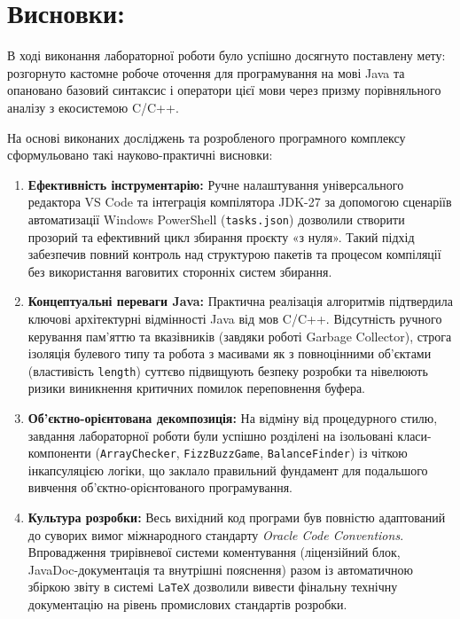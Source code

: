 \section{Висновки:}

В ході виконання лабораторної роботи було успішно досягнуто поставлену мету: 
розгорнуто кастомне робоче оточення для програмування на мові Java та опановано 
базовий синтаксис і оператори цієї мови через призму порівняльного аналізу з екосистемою C/C++.

На основі виконаних досліджень та розробленого програмного комплексу сформульовано такі науково-практичні висновки:
\begin{enumerate}
    \item \textbf{Ефективність інструментарію:} 
    Ручне налаштування універсального редактора VS Code та інтеграція компілятора JDK-27 
    за допомогою сценаріїв автоматизації Windows PowerShell (\texttt{tasks.json}) дозволили 
    створити прозорий та ефективний цикл збирання проєкту «з нуля». Такий підхід забезпечив 
    повний контроль над структурою пакетів та процесом компіляції без використання ваговитих 
    сторонніх систем збирання.
    \item \textbf{Концептуальні переваги Java:} 
    Практична реалізація алгоритмів підтвердила ключові архітектурні відмінності Java від 
    мов C/C++. Відсутність ручного керування пам'яттю та вказівників (завдяки роботі Garbage Collector), 
    строга ізоляція булевого типу та робота з масивами як з повноцінними об'єктами (властивість \texttt{length}) 
    суттєво підвищують безпеку розробки та нівелюють ризики виникнення критичних помилок переповнення буфера.
    \item \textbf{Об'єктно-орієнтована декомпозиція:} 
    На відміну від процедурного стилю, завдання лабораторної роботи були успішно розділені на ізольовані 
    класи-компоненти (\texttt{ArrayChecker}, \texttt{FizzBuzzGame}, \texttt{BalanceFinder}) із чіткою 
    інкапсуляцією логіки, що заклало правильний фундамент для подальшого вивчення об'єктно-орієнтованого програмування.
    \item \textbf{Культура розробки:} 
    Весь вихідний код програми був повністю адаптований до суворих вимог міжнародного стандарту \textit{Oracle Code Conventions}. 
    Впровадження трирівневої системи коментування (ліцензійний блок, JavaDoc-документація та внутрішні пояснення) разом із 
    автоматичною збіркою звіту в системі \texttt{LaTeX} дозволили вивести фінальну технічну документацію на рівень промислових стандартів розробки.
\end{enumerate}


